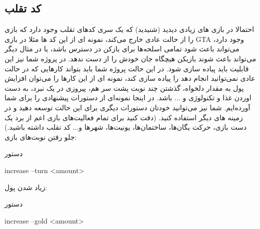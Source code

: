 \documentclass[]{article}
\begin{document}
\subsection*{\titr کد تقلب}
احتمالا در بازی های زیادی دیدید (شنیدید) که یک سری کدهای تقلب وجود دارد که بازی را از حالت عادی خارج می‌کند، نمونه ای از این کد ها مثلا در بازی GTA وجود دارد، می‌تواند باعث شود تمامی اسلحه‌ها برای بازکن در دسترس باشد، یا در مثال دیگر می‌تواند باعث شوند بازیکن هیچگاه جان خودش را از دست ندهد. در پروژه شما نیز این قابلیت باید پیاده سازی شود. در این حالت پروژه شما باید بتواند کارهایی که در حالت عادی نمی‌توانید انجام دهد را پیاده سازی کند، نمونه ای از این کار‌ها را می‌توان افزایش پول به مقدار دلخواه، گذشتن چند نوبت پشت سر هم، پیروزی در یک نبرد، به دست اوردن غذا و تکنولوژی و ... باشد. در اینجا نمونه‌ای از دستورات پیشنهادی را برای شما آورده‌ایم. شما نیز می‌توانید خودتان دستورات دیگری برای این حالت توسعه دهید و در زمینه های دیگر استفاده کنید. (دقت کنید برای تمام فعالیت‌های بازی اعم از برد یک دست بازی، حرکت یگان‌ها، ساختمان‌ها، یونیت‌ها، شهرها و... کد تقلب داشته باشید.)\\
جلو رفتن نوبت‌های بازی:
\begin{mybox}[colback=yellow]{دستور}
	\begin{latin}	
		increase --turn <amount>
	\end{latin}
\end{mybox}
زیاد شدن پول:
\begin{mybox}[colback=yellow]{دستور}
	\begin{latin}	
		increase --gold <amount>
	\end{latin}
\end{mybox}
\end{document}
